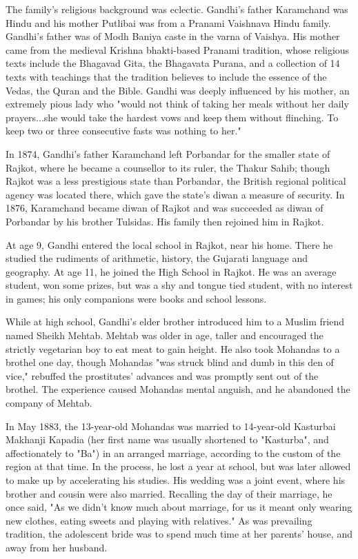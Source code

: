 The family's religious background was eclectic. Gandhi's father
Karamchand was Hindu and his mother Putlibai was from a Pranami
Vaishnava Hindu family. Gandhi's father was of Modh Baniya caste in the
varna of Vaishya. His mother came from the medieval Krishna bhakti-based
Pranami tradition, whose religious texts include the Bhagavad Gita, the
Bhagavata Purana, and a collection of 14 texts with teachings that the
tradition believes to include the essence of the Vedas, the Quran and
the Bible. Gandhi was deeply influenced by his mother, an extremely
pious lady who "would not think of taking her meals without her daily
prayers...she would take the hardest vows and keep them without
flinching. To keep two or three consecutive fasts was nothing to her."

In 1874, Gandhi's father Karamchand left Porbandar for the smaller state
of Rajkot, where he became a counsellor to its ruler, the Thakur Sahib;
though Rajkot was a less prestigious state than Porbandar, the British
regional political agency was located there, which gave the state's
diwan a measure of security. In 1876, Karamchand became diwan of Rajkot
and was succeeded as diwan of Porbandar by his brother Tulsidas. His
family then rejoined him in Rajkot.

At age 9, Gandhi entered the local school in Rajkot, near his home.
There he studied the rudiments of arithmetic, history, the Gujarati
language and geography. At age 11, he joined the High School in Rajkot.
He was an average student, won some prizes, but was a shy and tongue
tied student, with no interest in games; his only companions were books
and school lessons.

While at high school, Gandhi's elder brother introduced him to a Muslim
friend named Sheikh Mehtab. Mehtab was older in age, taller and
encouraged the strictly vegetarian boy to eat meat to gain height. He
also took Mohandas to a brothel one day, though Mohandas "was struck
blind and dumb in this den of vice," rebuffed the prostitutes' advances
and was promptly sent out of the brothel. The experience caused Mohandas
mental anguish, and he abandoned the company of Mehtab.

In May 1883, the 13-year-old Mohandas was married to 14-year-old
Kasturbai Makhanji Kapadia (her first name was usually shortened to
"Kasturba", and affectionately to "Ba") in an arranged marriage,
according to the custom of the region at that time. In the process, he
lost a year at school, but was later allowed to make up by accelerating
his studies. His wedding was a joint event, where his brother and cousin
were also married. Recalling the day of their marriage, he once said,
"As we didn't know much about marriage, for us it meant only wearing new
clothes, eating sweets and playing with relatives." As was prevailing
tradition, the adolescent bride was to spend much time at her parents'
house, and away from her husband.

